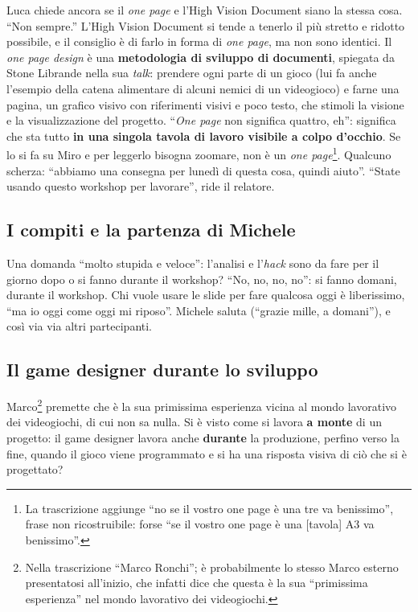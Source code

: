 Luca chiede ancora se il \emph{one page} e l'High Vision Document siano la stessa
cosa. ``Non sempre.'' L'High Vision Document si tende a tenerlo il più stretto e
ridotto possibile, e il consiglio è di farlo in forma di \emph{one page}, ma non
sono identici. Il \emph{one page design} è una \textbf{metodologia di sviluppo di
documenti}, spiegata da Stone Librande nella sua \emph{talk}: prendere ogni parte
di un gioco (lui fa anche l'esempio della catena alimentare di alcuni nemici di un
videogioco) e farne una pagina, un grafico visivo con riferimenti visivi e poco
testo, che stimoli la visione e la visualizzazione del progetto. ``\emph{One page}
non significa quattro, eh'': significa che sta tutto \textbf{in una singola tavola
di lavoro visibile a colpo d'occhio}. Se lo si fa su Miro e per leggerlo bisogna
zoomare, non è un \emph{one page}\footnote{La trascrizione aggiunge ``no se il
vostro one page è una tre va benissimo'', frase non ricostruibile: forse ``se il
vostro one page è una [tavola] A3 va benissimo''.}. Qualcuno scherza: ``abbiamo una
consegna per lunedì di questa cosa, quindi aiuto''. ``State usando questo
workshop per lavorare'', ride il relatore.

\subsection{I compiti e la partenza di Michele}

Una domanda ``molto stupida e veloce'': l'analisi e l'\emph{hack} sono da fare
per il giorno dopo o si fanno durante il workshop? ``No, no, no, no'': si fanno
domani, durante il workshop. Chi vuole usare le slide per fare qualcosa oggi è
liberissimo, ``ma io oggi come oggi mi riposo''. Michele saluta (``grazie mille, a
domani''), e così via via altri partecipanti.

\subsection{Il game designer durante lo sviluppo}

Marco\footnote{Nella trascrizione ``Marco Ronchi''; è probabilmente lo stesso
Marco esterno presentatosi all'inizio, che infatti dice che questa è la sua
``primissima esperienza'' nel mondo lavorativo dei videogiochi.} premette che è
la sua primissima esperienza vicina al mondo lavorativo dei videogiochi, di cui
non sa nulla. Si è visto come si lavora \textbf{a monte} di un progetto: il game
designer lavora anche \textbf{durante} la produzione, perfino verso la fine,
quando il gioco viene programmato e si ha una risposta visiva di ciò che si è
progettato?

